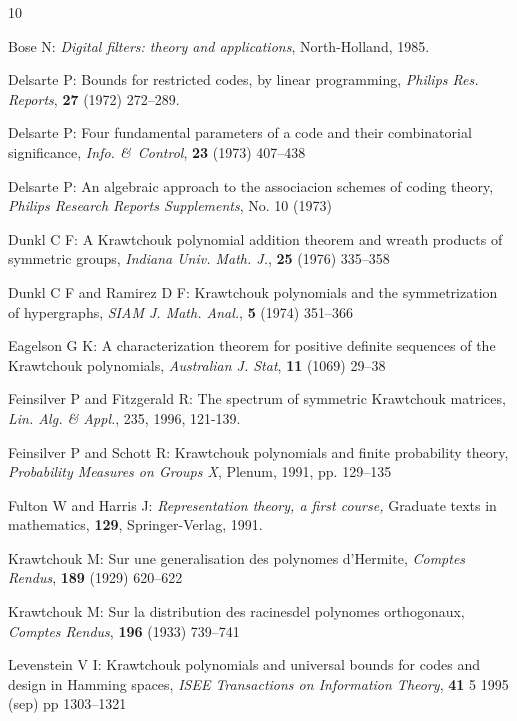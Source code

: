 \documentclass[12pt]{article}    %
\begin{document}
\begin{thebibliography}{10}

Bose N:
\emph{Digital filters: theory and applications},
North-Holland, 1985.


Delsarte P:
Bounds for restricted codes, by linear programming,
\emph{Philips Res. Reports}, {\bf 27} (1972) 272--289.

Delsarte P:
Four fundamental parameters of a code and their combinatorial significance,  
\emph{Info. \&\ Control}, {\bf 23} (1973) 407--438

Delsarte P:  
An algebraic approach to the associacion schemes of coding theory, 
\emph{Philips Research Reports Supplements}, No. 10 (1973)

Dunkl C F:
A Krawtchouk polynomial addition theorem and  wreath products of symmetric
groups, 
\emph{Indiana Univ. Math. J.},  {\bf 25} (1976) 335--358

Dunkl C F and Ramirez D F:
Krawtchouk polynomials and the symmetrization of hypergraphs,
\emph{SIAM J. Math. Anal.}, {\bf 5} (1974) 351--366

Eagelson G K:
A characterization theorem for positive definite sequences of the
Krawtchouk polynomials,  
\emph{Australian J. Stat}, {\bf 11} (1069) 29--38

Feinsilver P and Fitzgerald R: 
The spectrum of symmetric Krawtchouk matrices, 
\emph{Lin. Alg. \& Appl.}, 235, 1996, 121-139. 

Feinsilver P and Schott R:
Krawtchouk polynomials and finite probability theory,
\emph{Probability Measures on Groups X}, Plenum, 1991, pp. 129--135

Fulton W and Harris J:
\emph{Representation theory, a first course,}
Graduate texts in mathematics, {\bf 129},
Springer-Verlag, 1991.

Krawtchouk M:
Sur une generalisation des polynomes d'Hermite,
\emph{Comptes Rendus}, {\bf 189} (1929) 620--622

Krawtchouk M: 
Sur la distribution des racinesdel polynomes orthogonaux,
\emph{Comptes Rendus}, {\bf 196} (1933) 739--741

Levenstein V I:
Krawtchouk polynomials and universal bounds for codes and design in Hamming
spaces,
\emph{ISEE Transactions on Information Theory}, {\bf 41} 5 1995 (sep)  pp
1303--1321


\end{thebibliography}
\end{document}
